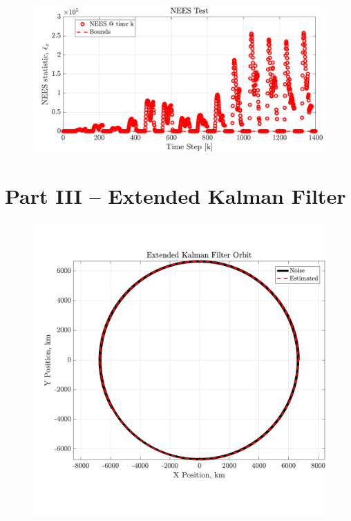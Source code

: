 \documentclass[a4paper]{aiaa-tc}
\begin{document}
  \begin{figure}[H]
 \centering
 \includegraphics[width=\textwidth]{Figures/LKF_NEES.pdf}
 \end{figure}
 
 
 \section*{Part III -- Extended Kalman Filter}
  \begin{figure}[H]
 \centering
 \includegraphics[width=\textwidth]{Figures/EKF_orbit.pdf}
 \end{figure}
 
\end{document}
